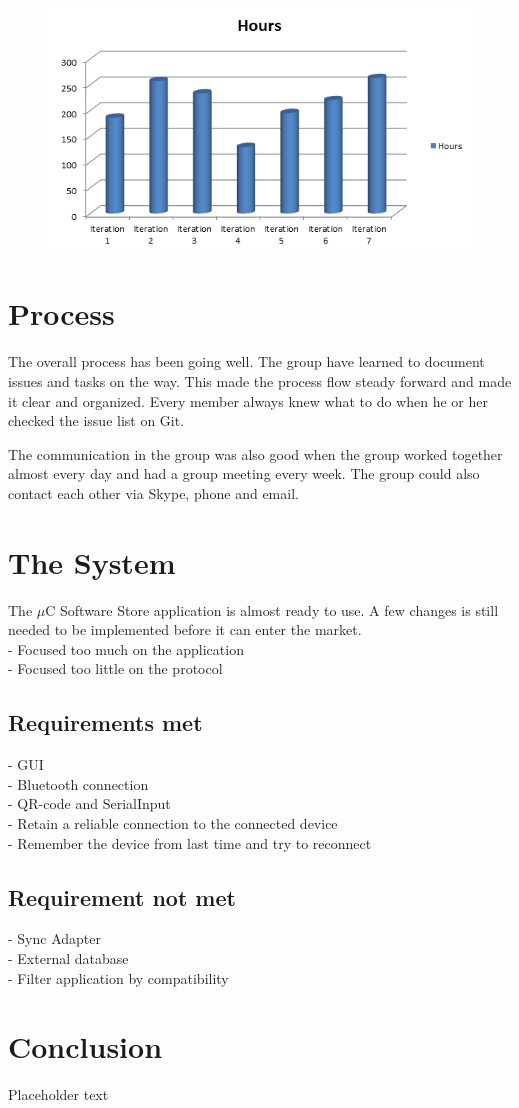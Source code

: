 	\begin{figure}[H]
	\centering
	\label{fig:workhours}
	\includegraphics[scale=0.8]{images/workhours_chart2.png}
	\end{figure}

	\section{Process}
	The overall process has been going well. The group have learned to document issues and tasks on the way. This made the process flow steady forward and made it clear and organized. Every member always knew what to do when he or her checked the issue list on Git.

	The communication in the group was also good when the group worked together almost every day and had a group meeting every week. The group could also contact each other via Skype, phone and email.

	\section{The System}
	The $\mu$C Software Store application is almost ready to use. A few changes is still needed to be implemented before it can enter the market. \\

	- Focused too much on the application\\
	- Focused too little on the protocol

		\subsection{Requirements met}
			- GUI\\
			- Bluetooth connection\\
			- QR-code and SerialInput\\
			- Retain a reliable connection to the connected device\\
			- Remember the device from last time and try to reconnect\\

		\subsection{Requirement not met}
			- Sync Adapter\\
			- External database\\
			- Filter application by compatibility\\

	\section{Conclusion}
    Placeholder text
